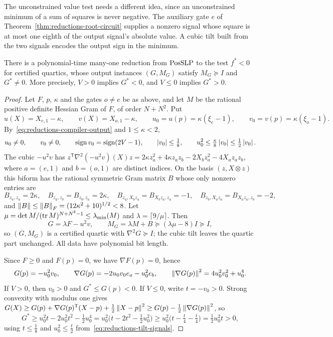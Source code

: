 The unconstrained value test needs a different idea, since an unconstrained
minimum of a sum of squares is never negative. The auxiliary gate $e$ of
Theorem~\ref{thm:reductions-root-circuit} supplies a nonzero signal whose
square is at most one eighth of the output signal's absolute value. A cubic
tilt built from the two signals encodes the output sign in the minimum.

\begin{theorem}
\label{thm:reductions-min-sign}
There is a polynomial-time many-one reduction from $\mathrm{PosSLP}$ to the test
$f^*<0$ for certified quartics, whose output instances $(G,M_G)$ satisfy
$M_G\succeq I$ and $G^*\ne0$. More precisely, $V>0$ implies $G^*<0$, and
$V\le0$ implies $G^*>0$.
\end{theorem}

\begin{proof}
Let $F$, $p$, $\kappa$ and the gates $o\ne e$ be as above, and let $M$ be the
rational positive definite Hessian Gram of $F$, of order $N+N^2$. Put
\[
 u(X)=X_{e,1}-\kappa,\qquad v(X)=X_{o,1}-\kappa,\qquad
 u_0=u(p)=\kappa(\xi_e-1),\qquad v_0=v(p)=\kappa(\xi_o-1).
\]
By~\eqref{eq:reductions-compiler-output} and $1\le\kappa<2$,
\begin{equation}
 u_0\ne0,\qquad v_0\ne0,\qquad \operatorname{sign}v_0=\operatorname{sign}(2V-1),
 \qquad \left\lvert v_0\right\rvert\le\tfrac18,\qquad u_0^2\le\tfrac{\kappa}{8}\left\lvert v_0\right\rvert\le\tfrac12\left\lvert v_0\right\rvert.
 \label{eq:reductions-tilt-signals}
\end{equation}
The cubic $-u^2v$ has
$z^{\mathsf T}\nabla^2(-u^2v)(X)z=2\kappa z_a^2+4\kappa z_az_b-2X_bz_a^2-4X_az_az_b$,
where $a=(e,1)$ and $b=(o,1)$ are distinct indices. On the basis $(z,X\otimes z)$
this biform has the rational symmetric Gram matrix $B$ whose only nonzero
entries are
\[
 B_{z_a,z_a}=2\kappa,\quad B_{z_a,z_b}=B_{z_b,z_a}=2\kappa,\quad
 B_{z_a,X_bz_a}=B_{X_bz_a,z_a}=-1,\quad
 B_{z_b,X_az_a}=B_{X_az_a,z_b}=-2,
\]
and $\left\lVert B\right\rVert\le\left\lVert B\right\rVert_F=(12\kappa^2+10)^{1/2}<8$. Let
$\mu=\det M/(\operatorname{tr} M)^{N+N^2-1}\le\lambda_{\min}(M)$ and
$\lambda=\lceil9/\mu\rceil$. Then
\[
 G=\lambda F-u^2v,\qquad M_G=\lambda M+B\succeq(\lambda\mu-8)I\succeq I,
\]
so $(G,M_G)$ is a certified quartic with $\nabla^2G\succeq I$; the cubic tilt
leaves the quartic part unchanged. All data have polynomial bit length.

Since $F\ge0$ and $F(p)=0$, we have $\nabla F(p)=0$, hence
\[
 G(p)=-u_0^2v_0,\qquad \nabla G(p)=-2u_0v_0e_a-u_0^2e_b,\qquad
 \left\lVert\nabla G(p)\right\rVert^2=4u_0^2v_0^2+u_0^4.
\]
If $V>0$, then $v_0>0$ and $G^*\le G(p)<0$. If $V\le0$, write $t=-v_0>0$.
Strong convexity with modulus one gives
$G(X)\ge G(p)+\nabla G(p)^{\mathsf T}(X-p)+\frac12\left\lVert X-p\right\rVert^2
\ge G(p)-\frac12\left\lVert\nabla G(p)\right\rVert^2$, so
\[
 G^*\ge u_0^2t-2u_0^2t^2-\tfrac12u_0^4
 =u_0^2\bigl(t-2t^2-\tfrac12u_0^2\bigr)
 \ge u_0^2\bigl(t-\tfrac t4-\tfrac t4\bigr)=\tfrac12u_0^2t>0,
\]
using $t\le\frac18$ and $u_0^2\le\frac t2$ from~\eqref{eq:reductions-tilt-signals}.
\end{proof}

